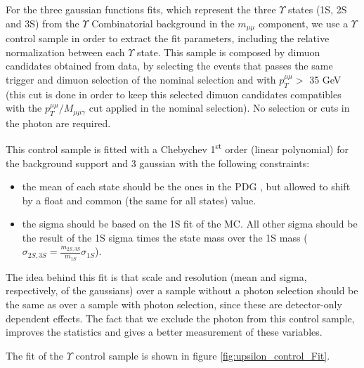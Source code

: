 For the three gaussian functions fits, which represent the three $\Upsilon$ states (1S, 2S and 3S) from the $\Upsilon$ Combinatorial background in the $m_{\mu\mu}$ component, we use a $\Upsilon$ control sample in order to extract the fit parameters, including the relative normalization between each $\Upsilon$ state. This sample is composed by dimuon candidates obtained from data, by selecting the events that passes the same trigger and dimuon selection of the nominal selection and with $p_{T}^{\mu\mu} > $ 35 GeV (this cut is done in order to keep this selected dimuon candidates compatibles with the $p_{T}^{\mu\mu}/M_{\mu\mu\gamma}$ cut applied in the nominal selection). No selection or cuts in the photon are required.


This control sample is fitted with a Chebychev 1\textsuperscript{st} order (linear polynomial) for the background support and 3 gaussian with the following constraints:

\begin{itemize}
  \item the mean of each state should be the ones in the PDG \cite{pdg_2020}, but allowed to shift by a float and common (the same for all states) value.
  \item the sigma should be based on the 1S fit of the MC. All other sigma should be the result of the 1S sigma times the state mass over the 1S mass ($\sigma_{2S,3S} = \frac{m_{2S,3S}}{m_{1S}} \sigma_{1S}$).
\end{itemize}

The idea behind this fit is that scale and resolution (mean and sigma, respectively, of the gaussians) over a sample without a photon selection should be the same as over a sample with photon selection, since these are detector-only dependent effects. The fact that we exclude the photon from this control sample, improves the statistics and gives a better measurement of these variables.

The fit of the $\Upsilon$ control sample is shown in figure \ref{fig:upsilon_control_Fit}.



